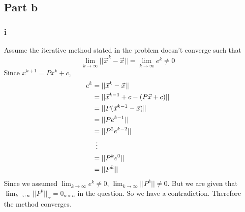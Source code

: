 \documentclass[12pt]{article}
\begin{document}
\subsection*{Part b}
\subsubsection*{i}
Assume the iterative method stated in the problem doesn't converge such that 
\begin{equation}
\lim_{k \rightarrow \infty} ||\vec{x}^k - \vec{x}|| = \lim_{k \rightarrow \infty} e^k \neq 0
\end{equation}
Since $x^{k+1} = Px^k + c$,
\begin{equation}
\begin{split}
e^{k} &= ||\vec{x}^k - \vec{x}|| \\
&= || \vec{x}^{k-1} + c - (P\vec{x} + c) || \\
&= ||P(\vec{x}^{k-1} - \vec{x})|| \\ 
&= ||Pe^{k-1}|| \\
&= ||P^2e^{k-2}|| \\
& \hspace{0.5em} \vdots \\
&= ||P^ke^0|| \\
&= ||P^k|| \\
\end{split}
\end{equation}
Since we assumed $\lim_{k \rightarrow \infty} e^k \neq 0$, $\lim_{k \rightarrow \infty} ||P^k|| \neq 0$. But we are given that $\lim_{k \rightarrow \infty} ||P^k||_\alpha = 0_{n \times n}$ in the question. So we have a contradiction. Therefore the method converges.
\end{document}
